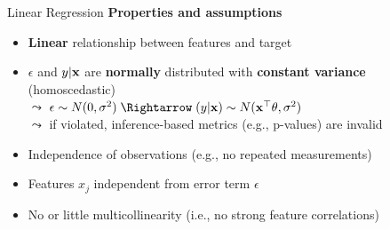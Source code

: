 \documentclass[11pt,compress,t,notes=noshow, aspectratio=169, xcolor=table]{beamer}
\begin{document}
\begin{frame}[c]{Linear Regression}
   \vspace*{0.2cm} 
   \pause
    \textbf{Properties and assumptions}  
    \begin{itemize}[<+->]
    \item \textbf{Linear} relationship between features and target
    \item $\epsilon$ and $y \vert \xv$ are \textbf{normally} distributed with \textbf{constant variance} (homoscedastic)\\
    $\leadsto$ $\epsilon \sim N(0, \sigma^2) \; \Rightarrow \; (y \vert \xv) \sim N(\xv^\top \theta, \sigma^2)$\\
    $\leadsto$ if violated, inference-based metrics (e.g., p-values) are invalid
    \item Independence of observations (e.g., no repeated measurements) %
    \item Features $x_j$ independent from error term $\epsilon$
    \item No or little multicollinearity (i.e., no strong feature correlations)
    \end{itemize}

\end{frame}
\end{document}
